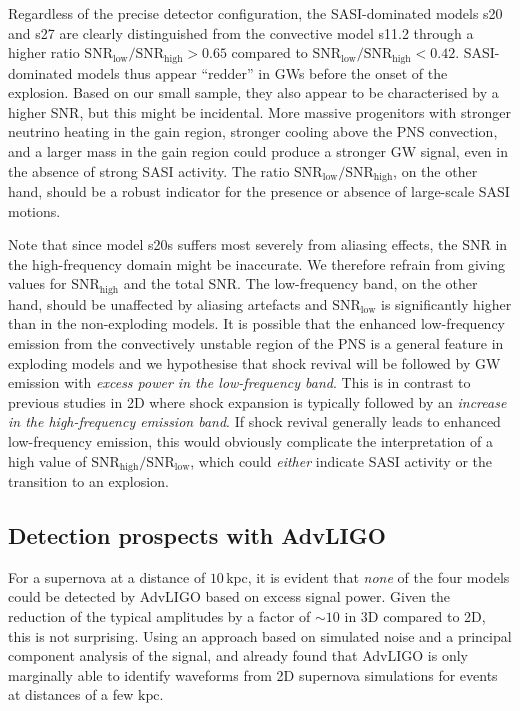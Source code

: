 Regardless of the precise detector configuration, the SASI-dominated
models s20 and s27 are clearly distinguished from the
convective model s11.2 through a higher ratio
$\mathrm{SNR}_\mathrm{low}/\mathrm{SNR}_\mathrm{high} >0.65$ compared
to $\mathrm{SNR}_\mathrm{low}/\mathrm{SNR}_\mathrm{high} <0.42$.
SASI-dominated models thus appear ``redder'' in GWs
before the onset of the explosion.
Based on our small sample, they also appear to be characterised by a higher SNR,
but this might be incidental. More massive progenitors with
stronger neutrino heating in the gain region, stronger cooling above
the PNS convection, and a larger mass in the gain region could 
produce a stronger GW signal, even in the absence of strong SASI activity. The ratio
$\mathrm{SNR}_\mathrm{low}/\mathrm{SNR}_\mathrm{high}$, on the other hand, should be a robust indicator for the presence or absence of
large-scale SASI motions.

Note that since model s20s suffers most severely from aliasing effects, the SNR
in the high-frequency domain might be inaccurate. We therefore refrain from giving values for $\mathrm{SNR}_{\mathrm{high}}$ and the total SNR.  The low-frequency band, on the other hand, should be unaffected by aliasing artefacts and $\mathrm{SNR}_\mathrm{low}$ is significantly
higher than in the non-exploding models. It is possible that the
enhanced low-frequency emission from the convectively unstable region
of the PNS is a general feature in exploding models and we
hypothesise that shock revival will be followed by GW emission with \emph{excess power in
  the low-frequency band}. This is in contrast to previous studies in 2D
\citep{murphy_09,mueller_13} where shock expansion is typically
followed by an \emph{increase in the high-frequency emission band}.
If shock revival generally leads to enhanced low-frequency emission,
this would obviously complicate the interpretation of
a high value of $\mathrm{SNR}_\mathrm{high}/\mathrm{SNR}_\mathrm{low}$,
which could \emph{either} indicate SASI activity or the transition
to an explosion.

\subsection{Detection prospects with AdvLIGO}
For a supernova at a distance of $10 \, \mathrm{kpc}$, it is evident
that \emph{none} of the four models could be detected by AdvLIGO
based on excess signal power. Given the reduction of the typical
amplitudes by a factor of $\mathord{\sim} 10$ in 3D compared to 2D,
this is not surprising. Using an approach based on simulated noise and
a principal component analysis of the signal, \citet{logue_12}
and \citet{gossan_15} already
found that AdvLIGO is only marginally able to identify waveforms
from 2D supernova simulations for events at distances of a few
$\mathrm{kpc}$. 

